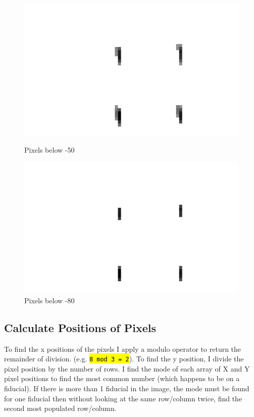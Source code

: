 \documentclass[10pt]{article}
\begin{document}
    \begin{figure}[h]
        \begin{minipage}{0.4\textwidth}
            \begin{center}
                \includegraphics[width=.75\linewidth]{plots_tables_images/below50.png}
                \caption{Pixels below -50}
            \end{center}
        \end{minipage}
        \begin{minipage}{0.4\textwidth}
            \begin{center}
                \includegraphics[width=.75\linewidth]{plots_tables_images/below80.png}
                \caption{Pixels below -80}
            \end{center}
        \end{minipage}
    \end{figure}

    \subsection{Calculate Positions of Pixels} %
    \label{sub:calculate_positions_of_pixels}
    To find the x positions of the pixels I apply a modulo operator to return the remainder of division. (e.g. \hl{\texttt{8 mod 3 = 2}}). To find the y position, I divide the pixel position by the number of rows. I find the mode of each array of X and Y pixel positions to find the most common number (which happens to be on a fiducial). If there is more than 1 fiducial in the image, the mode must be found for one fiducial then without looking at the same row/column twice, find the second most populated row/column.
\end{document}
